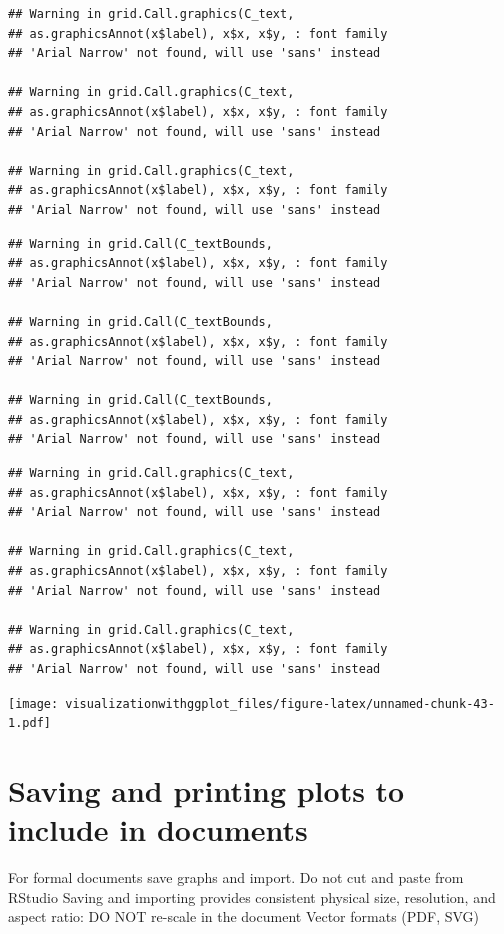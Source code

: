 \documentclass[]{krantz}
\begin{document}
\begin{verbatim}
## Warning in grid.Call.graphics(C_text,
## as.graphicsAnnot(x$label), x$x, x$y, : font family
## 'Arial Narrow' not found, will use 'sans' instead

## Warning in grid.Call.graphics(C_text,
## as.graphicsAnnot(x$label), x$x, x$y, : font family
## 'Arial Narrow' not found, will use 'sans' instead

## Warning in grid.Call.graphics(C_text,
## as.graphicsAnnot(x$label), x$x, x$y, : font family
## 'Arial Narrow' not found, will use 'sans' instead
\end{verbatim}

\begin{verbatim}
## Warning in grid.Call(C_textBounds,
## as.graphicsAnnot(x$label), x$x, x$y, : font family
## 'Arial Narrow' not found, will use 'sans' instead

## Warning in grid.Call(C_textBounds,
## as.graphicsAnnot(x$label), x$x, x$y, : font family
## 'Arial Narrow' not found, will use 'sans' instead

## Warning in grid.Call(C_textBounds,
## as.graphicsAnnot(x$label), x$x, x$y, : font family
## 'Arial Narrow' not found, will use 'sans' instead
\end{verbatim}

\begin{verbatim}
## Warning in grid.Call.graphics(C_text,
## as.graphicsAnnot(x$label), x$x, x$y, : font family
## 'Arial Narrow' not found, will use 'sans' instead

## Warning in grid.Call.graphics(C_text,
## as.graphicsAnnot(x$label), x$x, x$y, : font family
## 'Arial Narrow' not found, will use 'sans' instead

## Warning in grid.Call.graphics(C_text,
## as.graphicsAnnot(x$label), x$x, x$y, : font family
## 'Arial Narrow' not found, will use 'sans' instead
\end{verbatim}

\texttt{[image: visualizationwithggplot\_files/figure-latex/unnamed-chunk-43-1.pdf]}

\hypertarget{saving-and-printing-plots-to-include-in-documents}{%
\section{Saving and printing plots to include in documents}\label{saving-and-printing-plots-to-include-in-documents}}

For formal documents save graphs and import. Do not cut and paste from RStudio
Saving and importing provides consistent physical size, resolution, and aspect ratio: DO NOT re-scale in the document
Vector formats (PDF, SVG)
\end{document}
